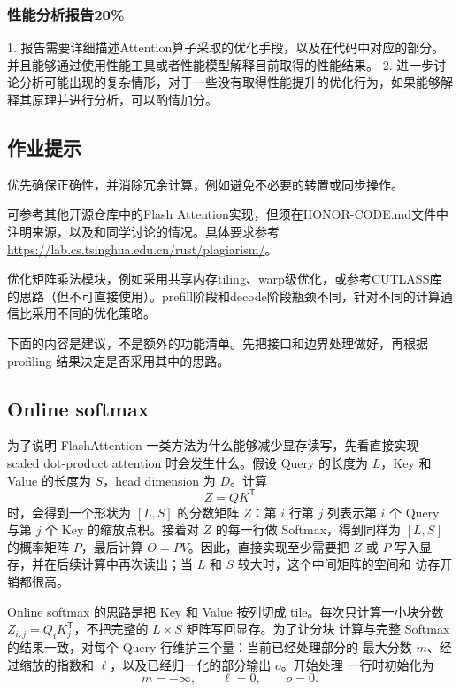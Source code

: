 \documentclass{article}
\begin{document}
\subsubsection{性能分析报告20\%}
1. 报告需要详细描述Attention算子采取的优化手段，以及在代码中对应的部分。并且能够通过使用性能工具或者性能模型解释目前取得的性能结果。
2. 进一步讨论分析可能出现的复杂情形，对于一些没有取得性能提升的优化行为，如果能够解释其原理并进行分析，可以酌情加分。
\subsection{作业提示}
优先确保正确性，并消除冗余计算，例如避免不必要的转置或同步操作。

可参考其他开源仓库中的Flash Attention实现，但须在HONOR-CODE.md文件中注明来源，以及和同学讨论的情况。具体要求参考\url{https://lab.cs.tsinghua.edu.cn/rust/plagiarism/}。

优化矩阵乘法模块，例如采用共享内存tiling、warp级优化，或参考CUTLASS库的思路（但不可直接使用）。prefill阶段和decode阶段瓶颈不同，针对不同的计算通信比采用不同的优化策略。

下面的内容是建议，不是额外的功能清单。先把接口和边界处理做好，再根据 profiling
结果决定是否采用其中的思路。

\subsection{Online softmax}

为了说明 FlashAttention 一类方法为什么能够减少显存读写，先看直接实现
scaled dot-product attention 时会发生什么。假设 Query 的长度为 $L$，Key 和 Value
的长度为 $S$，head dimension 为 $D$。计算
\begin{equation}
  Z = QK^\mathsf{T}
\end{equation}
时，会得到一个形状为 $[L,S]$ 的分数矩阵 $Z$：第 $i$ 行第 $j$ 列表示第 $i$ 个
Query 与第 $j$ 个 Key 的缩放点积。接着对 $Z$ 的每一行做 Softmax，得到同样为
$[L,S]$ 的概率矩阵 $P$，最后计算 $O=PV$。因此，直接实现至少需要把 $Z$ 或 $P$
写入显存，并在后续计算中再次读出；当 $L$ 和 $S$ 较大时，这个中间矩阵的空间和
访存开销都很高。

Online softmax 的思路是把 Key 和 Value 按列切成 tile。每次只计算一小块分数
\(Z_{i,j}=Q_iK_j^\mathsf{T}\)，不把完整的 $L\times S$ 矩阵写回显存。为了让分块
计算与完整 Softmax 的结果一致，对每个 Query 行维护三个量：当前已经处理部分的
最大分数 $m$、经过缩放的指数和 $\ell$，以及已经归一化的部分输出 $o$。开始处理
一行时初始化为
\begin{equation}
  m=-\infty,\qquad \ell=0,\qquad o=0.
\end{equation}
\end{document}
